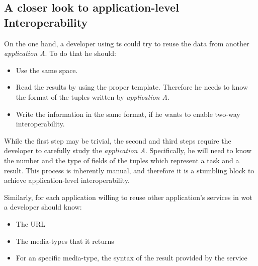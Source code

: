 \subsection{A closer look to application-level Interoperability}
\label{sec:closer}

On the one hand, a developer using \ac{ts} could try to reuse the data from another \emph{application A}.
To do that he should:
\begin{itemize}
 \item Use the same space.%
 \item Read the results by using the proper template.
	Therefore he needs to know the format of the tuples written by  \emph{application A}.
 \item Write the information in the same format, if he wants to enable two-way interoperability.

\end{itemize}

While the first step may be trivial, the second and third steps require the developer to carefully study the \emph{application A}.
Specifically, he will need to know the number and the type of fields of the tuples which represent a task and a result.
This process is inherently manual, and therefore it is a stumbling block to achieve application-level interoperability.

\medskip

Similarly, for each application willing to reuse other application's services in \ac{wot} a developer should know:
\begin{itemize}
 \item The URL
 \item The media-types that it returns
 \item For an specific media-type, the syntax of the result provided by the service %
\end{itemize}

